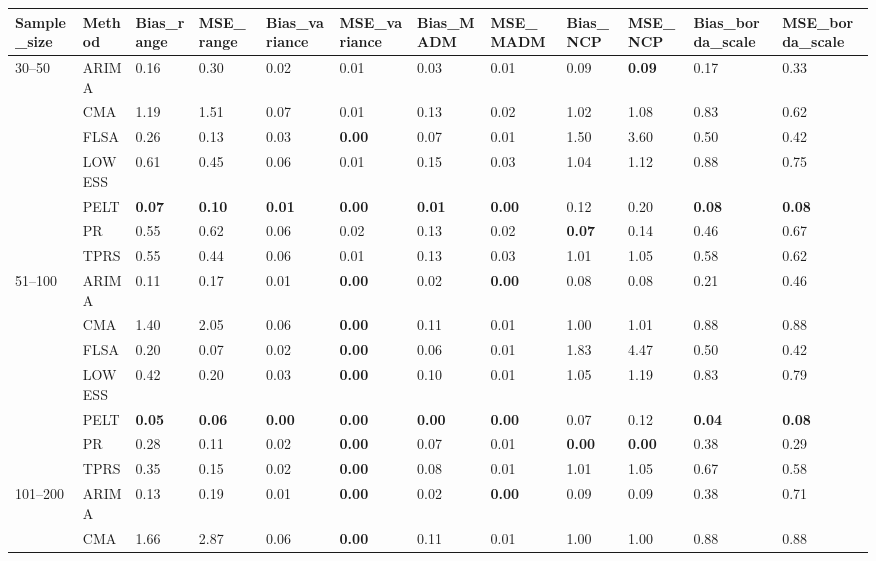 \begin{table}[ht]
\centering
\begin{tabular}{llllllllllll}
  \toprule
Sample_size & Method & Bias_range & MSE_range & Bias_variance & MSE_variance & Bias_MADM & MSE_MADM & Bias_NCP & MSE_NCP & Bias_borda_scale & MSE_borda_scale \\ 
  \midrule
30–50 & ARIMA & 0.16 & 0.30 & 0.02 & 0.01 & 0.03 & 0.01 & 0.09 & \textbf{0.09} & 0.17 & 0.33 \\ 
   & CMA & 1.19 & 1.51 & 0.07 & 0.01 & 0.13 & 0.02 & 1.02 & 1.08 & 0.83 & 0.62 \\ 
   & FLSA & 0.26 & 0.13 & 0.03 & \textbf{0.00} & 0.07 & 0.01 & 1.50 & 3.60 & 0.50 & 0.42 \\ 
   & LOWESS & 0.61 & 0.45 & 0.06 & 0.01 & 0.15 & 0.03 & 1.04 & 1.12 & 0.88 & 0.75 \\ 
   & PELT & \textbf{0.07} & \textbf{0.10} & \textbf{0.01} & \textbf{0.00} & \textbf{0.01} & \textbf{0.00} & 0.12 & 0.20 & \textbf{0.08} & \textbf{0.08} \\ 
   & PR & 0.55 & 0.62 & 0.06 & 0.02 & 0.13 & 0.02 & \textbf{0.07} & 0.14 & 0.46 & 0.67 \\ 
   & TPRS & 0.55 & 0.44 & 0.06 & 0.01 & 0.13 & 0.03 & 1.01 & 1.05 & 0.58 & 0.62 \\ 
  51–100 & ARIMA & 0.11 & 0.17 & 0.01 & \textbf{0.00} & 0.02 & \textbf{0.00} & 0.08 & 0.08 & 0.21 & 0.46 \\ 
   & CMA & 1.40 & 2.05 & 0.06 & \textbf{0.00} & 0.11 & 0.01 & 1.00 & 1.01 & 0.88 & 0.88 \\ 
   & FLSA & 0.20 & 0.07 & 0.02 & \textbf{0.00} & 0.06 & 0.01 & 1.83 & 4.47 & 0.50 & 0.42 \\ 
   & LOWESS & 0.42 & 0.20 & 0.03 & \textbf{0.00} & 0.10 & 0.01 & 1.05 & 1.19 & 0.83 & 0.79 \\ 
   & PELT & \textbf{0.05} & \textbf{0.06} & \textbf{0.00} & \textbf{0.00} & \textbf{0.00} & \textbf{0.00} & 0.07 & 0.12 & \textbf{0.04} & \textbf{0.08} \\ 
   & PR & 0.28 & 0.11 & 0.02 & \textbf{0.00} & 0.07 & 0.01 & \textbf{0.00} & \textbf{0.00} & 0.38 & 0.29 \\ 
   & TPRS & 0.35 & 0.15 & 0.02 & \textbf{0.00} & 0.08 & 0.01 & 1.01 & 1.05 & 0.67 & 0.58 \\ 
  101–200 & ARIMA & 0.13 & 0.19 & 0.01 & \textbf{0.00} & 0.02 & \textbf{0.00} & 0.09 & 0.09 & 0.38 & 0.71 \\ 
   & CMA & 1.66 & 2.87 & 0.06 & \textbf{0.00} & 0.11 & 0.01 & 1.00 & 1.00 & 0.88 & 0.88 \\ 

\end{tabular}
\end{table}
